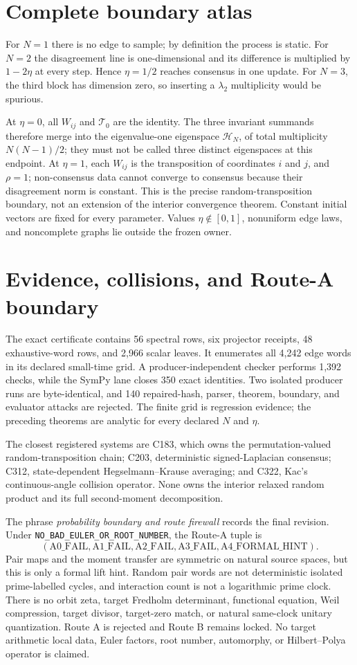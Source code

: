 \documentclass[10pt]{article}
\newcommand{\cT}{\mathcal T}
\begin{document}
\section{Complete boundary atlas}
For $N=1$ there is no edge to sample; by definition the process is static.
For $N=2$ the disagreement line is one-dimensional and its difference is
multiplied by $1-2\eta$ at every step.  Hence $\eta=1/2$ reaches consensus
in one update.  For $N=3$, the third block has dimension zero, so inserting
a $\lambda_2$ multiplicity would be spurious.

At $\eta=0$, all $W_{ij}$ and $\cT_0$ are the identity.  The three invariant
summands therefore merge into the eigenvalue-one eigenspace
$\mathscr H_N$, of total multiplicity $N(N-1)/2$; they must not be called
three distinct eigenspaces at this endpoint.  At $\eta=1$, each $W_{ij}$ is
the transposition of coordinates $i$ and $j$, and $\rho=1$; non-consensus
data cannot converge to consensus because their disagreement norm is
constant.  This is the precise random-transposition boundary, not an
extension of the interior convergence theorem.  Constant initial vectors
are fixed for every parameter.  Values $\eta\notin[0,1]$, nonuniform edge
laws, and noncomplete graphs lie outside the frozen owner.

\section{Evidence, collisions, and Route-A boundary}
The exact certificate contains 56 spectral rows, six projector receipts,
48 exhaustive-word rows, and 2,966 scalar leaves.  It enumerates all 4,242
edge words in its declared small-time grid.  A producer-independent checker
performs 1,392 checks, while the SymPy lane closes 350 exact identities.
Two isolated producer runs are byte-identical, and 140 repaired-hash,
parser, theorem, boundary, and evaluator attacks are rejected.  The finite
grid is regression evidence; the preceding theorems are analytic for every
declared $N$ and $\eta$.

The closest registered systems are C183, which owns the permutation-valued
random-transposition chain; C203, deterministic signed-Laplacian consensus;
C312, state-dependent Hegselmann--Krause averaging; and C322, Kac's
continuous-angle collision operator.  None owns the interior relaxed random
product and its full second-moment decomposition.

The phrase \emph{probability boundary and route firewall} records the final
revision.  Under \texttt{NO\_BAD\_EULER\_OR\_ROOT\_NUMBER}, the Route-A tuple
is
\[
 (\mathrm{A0\_FAIL},\mathrm{A1\_FAIL},\mathrm{A2\_FAIL},
  \mathrm{A3\_FAIL},\mathrm{A4\_FORMAL\_HINT}).
\]
Pair maps and the moment transfer are symmetric on natural source spaces,
but this is only a formal lift hint.  Random pair words are not deterministic
isolated prime-labelled cycles, and interaction count is not a logarithmic
prime clock.  There is no orbit zeta, target Fredholm determinant,
functional equation, Weil compression, target divisor, target-zero match,
or natural same-clock unitary quantization.  Route A is rejected and Route B
remains locked.  No target arithmetic local data, Euler factors, root number,
automorphy, or Hilbert--Polya operator is claimed.
\end{document}
